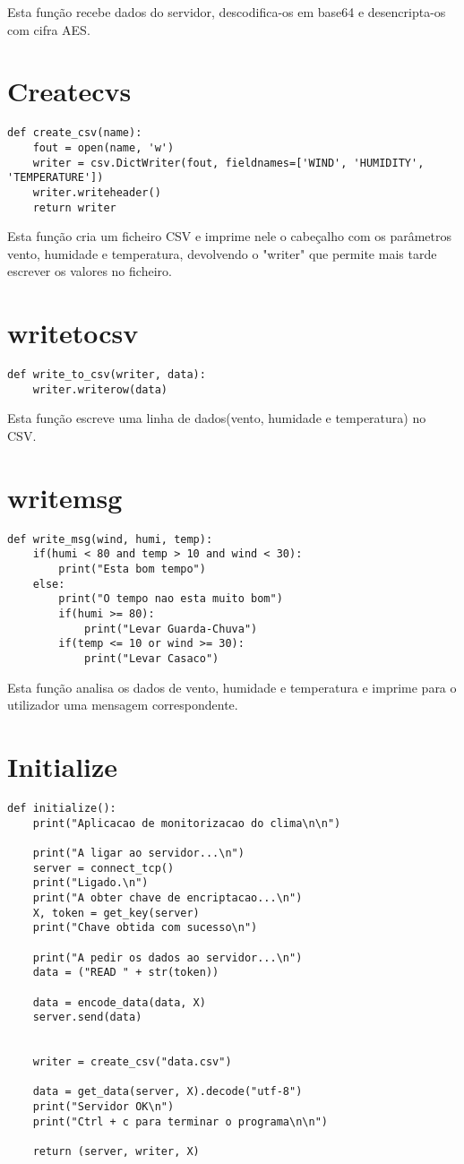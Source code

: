 \documentclass{report}
\begin{document}
Esta função recebe dados do servidor, descodifica-os em base64 e desencripta-os com cifra AES.

\section{Create\textunderscore cvs}
\begin{lstlisting}
def create_csv(name):
	fout = open(name, 'w')
	writer = csv.DictWriter(fout, fieldnames=['WIND', 'HUMIDITY', 'TEMPERATURE'])
	writer.writeheader()
	return writer
\end{lstlisting}

Esta função cria um ficheiro CSV e imprime nele o cabeçalho com os parâmetros vento, humidade e temperatura, devolvendo o "writer" que permite mais tarde escrever os valores no ficheiro.

\section{write\textunderscore to\textunderscore csv}
\begin{lstlisting}
def write_to_csv(writer, data):
    writer.writerow(data)
\end{lstlisting}

Esta função escreve uma linha de dados(vento, humidade e temperatura) no CSV.


\section{write\textunderscore msg}
\begin{lstlisting}
def write_msg(wind, humi, temp):
	if(humi < 80 and temp > 10 and wind < 30):
		print("Esta bom tempo")
	else:
		print("O tempo nao esta muito bom")
		if(humi >= 80):
			print("Levar Guarda-Chuva")
		if(temp <= 10 or wind >= 30):
			print("Levar Casaco")
\end{lstlisting}

Esta função analisa os dados de vento, humidade e temperatura e imprime para o utilizador uma mensagem correspondente.

\newpage

\section{Initialize}
\begin{lstlisting}
def initialize():
	print("Aplicacao de monitorizacao do clima\n\n")
	
	print("A ligar ao servidor...\n")
	server = connect_tcp()
	print("Ligado.\n")
	print("A obter chave de encriptacao...\n")
	X, token = get_key(server)
	print("Chave obtida com sucesso\n")

	print("A pedir os dados ao servidor...\n")
	data = ("READ " + str(token))

	data = encode_data(data, X)
	server.send(data)


	writer = create_csv("data.csv")
	
	data = get_data(server, X).decode("utf-8")
	print("Servidor OK\n")
	print("Ctrl + c para terminar o programa\n\n")
	
	return (server, writer, X)
\end{lstlisting}
\end{document}
